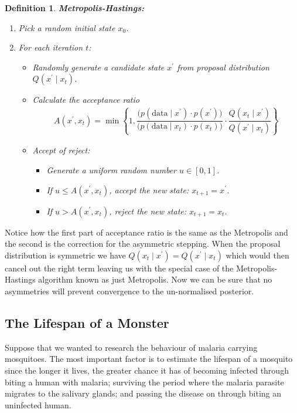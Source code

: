\documentclass[12pt,twoside]{report}   %
\newcommand{\bb}{\textbf}
\newcommand{\p}{\prime}
\newtheorem{definition}[theorem]{Definition}
\begin{document}
\vspace{7pt}
\begin{definition}\label{MH def}
\bb{Metropolis-Hastings:}
\begin{enumerate}
\item Pick a random initial state $x_0$.
\item For each iteration $t$:
\begin{itemize}
\item Randomly generate a candidate state $x^\p$ from proposal distribution $Q(x^\p\mid x_t)$.
\item Calculate the acceptance ratio
\begin{align*}
A(x^\p,x_t) = \min\left\{1,\dfrac{\big(p(\text{data}\mid x^\p)\cdot p(x^\p)\big)}{\big(p(\text{data}\mid x_t)\cdot p(x_t)\big)}\cdot\dfrac{Q(x_t\mid x^\p)}{Q(x^\p\mid x_t)}\right\}
\end{align*}
\item Accept of reject:
\begin{itemize}
\item Generate a uniform random number $u\in[0,1]$.
\item If $u\leq A(x^\p,x_t)$, accept the new state: $x_{t+1} = x^\p$.
\item If $u>A(x^\p,x_t)$, reject the new state: $x_{t+1} = x_t$.
\end{itemize}
\end{itemize}
\end{enumerate}
\end{definition}
Notice how the first part of acceptance ratio is the same as the Metropolis and the second is the correction for the asymmetric stepping. When the proposal distribution is symmetric we have $Q(x_t\mid x^\p) = Q(x^\p\mid x_t)$ which would then cancel out the right term leaving us with the special case of the Metropolis-Hastings algorithm known as just Metropolis. Now we can be sure that no asymmetries will prevent convergence to the un-normalised posterior.

\subsection{The Lifespan of a Monster}\label{Metropolis-Hastings Example}
\vspace{-0.35in}
\underline{\hspace{6.2in}}
\vspace{-0.1in}

Suppose that we wanted to research the behaviour of malaria carrying mosquitoes. The most important factor is to estimate the lifespan of a mosquito since the longer it lives, the greater chance it has of becoming infected through biting a human with malaria; surviving the period where the malaria parasite migrates to the salivary glands; and passing the disease on through biting an uninfected human.
\end{document}
